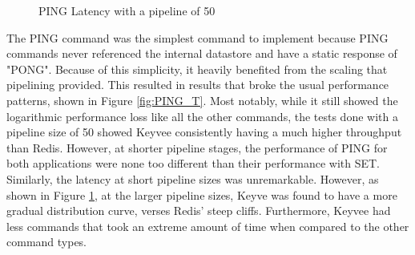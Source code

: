 \documentclass[english,10pt,twocolumn]{article}
\begin{document}
\begin{figure}[!htb]
	\caption{PING Latency with a pipeline of 50\label{fig:PING_L}}
\end{figure}
The PING command was the simplest command to implement because PING commands never referenced the internal datastore and have a static response of "PONG".
Because of this simplicity, it heavily benefited from the scaling that pipelining provided.
This resulted in results that broke the usual performance patterns, shown in Figure \ref{fig:PING_T}.
Most notably, while it still showed the logarithmic performance loss like all the other commands, the tests done with a pipeline size of 50 showed Keyvee consistently having a much higher throughput than Redis.
However, at shorter pipeline stages, the performance of PING for both applications were none too different than their performance with SET.
Similarly, the latency at short pipeline sizes was unremarkable.
However, as shown in Figure \ref{fig:PING_L}, at the larger pipeline sizes, Keyve was found to have a more gradual distribution curve, verses Redis' steep cliffs.
Furthermore, Keyvee had less commands that took an extreme amount of time when compared to the other command types.
\end{document}
